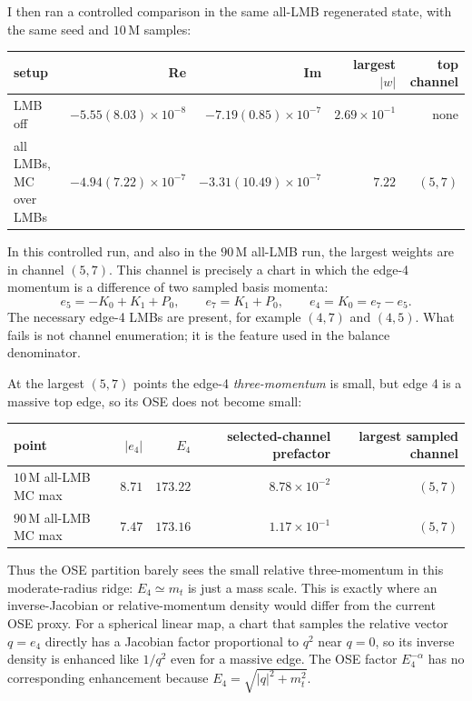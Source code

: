 \documentclass[11pt]{article}
\begin{document}
I then ran a controlled comparison in the same all-LMB regenerated state,
with the same seed and $10\,\mathrm{M}$ samples:
\begin{center}
\scriptsize
\begin{tabular}{lrrrr}
\toprule
setup & Re & Im & largest $|w|$ & top channel\\
\midrule
LMB off &
$-5.55(8.03)\times10^{-8}$ &
$-7.19(0.85)\times10^{-7}$ &
$2.69\times10^{-1}$ & none\\
all LMBs, MC over LMBs &
$-4.94(7.22)\times10^{-7}$ &
$-3.31(10.49)\times10^{-7}$ &
$7.22$ & $(5,7)$\\
\bottomrule
\end{tabular}
\end{center}
In this controlled run, and also in the $90\,\mathrm{M}$ all-LMB run, the
largest weights are in channel $(5,7)$.  This channel is precisely a chart in
which the edge-4 momentum is a difference of two sampled basis momenta:
\[
  e_5=-K_0+K_1+P_0,\qquad e_7=K_1+P_0,\qquad e_4=K_0=e_7-e_5.
\]
The necessary edge-4 LMBs are present, for example $(4,7)$ and $(4,5)$.  What
fails is not channel enumeration; it is the feature used in the balance
denominator.

At the largest $(5,7)$ points the edge-4 \emph{three-momentum} is small, but
edge 4 is a massive top edge, so its OSE does not become small:
\begin{center}
\scriptsize
\begin{tabular}{lrrrr}
\toprule
point & $|e_4|$ & $E_4$ & selected-channel prefactor &
largest sampled channel\\
\midrule
$10\,\mathrm{M}$ all-LMB MC max & $8.71$ & $173.22$ & $8.78\times10^{-2}$ &
$(5,7)$\\
$90\,\mathrm{M}$ all-LMB MC max & $7.47$ & $173.16$ & $1.17\times10^{-1}$ &
$(5,7)$\\
\bottomrule
\end{tabular}
\end{center}
Thus the OSE partition barely sees the small relative three-momentum in this
moderate-radius ridge: $E_4\simeq m_t$ is just a mass scale.  This is exactly
where an inverse-Jacobian or relative-momentum density would differ from the
current OSE proxy.  For a spherical linear map, a chart that samples the
relative vector $q=e_4$ directly has a Jacobian factor proportional to
$q^2$ near $q=0$, so its inverse density is enhanced like $1/q^2$ even for a
massive edge.  The OSE factor $E_4^{-\alpha}$ has no corresponding enhancement
because $E_4=\sqrt{|q|^2+m_t^2}$.
\end{document}

